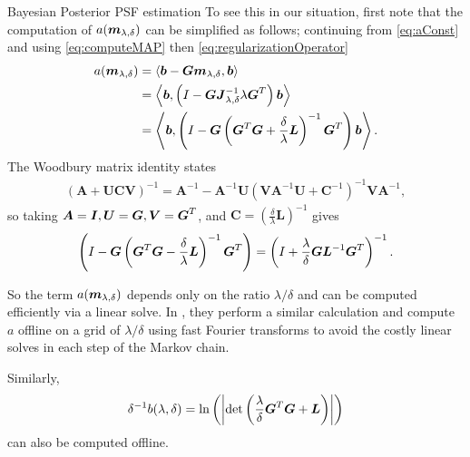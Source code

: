 \begin{chapter}{Bayesian Posterior PSF estimation}
To see this in our situation, first note that the computation of $a(\mbox{\boldmath$m$}_{\lambda,\delta})$ can be simplified as follows; continuing from \eqref{eq:aConst} and using \eqref{eq:computeMAP} then \eqref{eq:regularizationOperator}
\begin{align}
  a(\mbox{\boldmath$m$}_{\lambda,\delta}) 
    &= \left\langle\mbox{\boldmath$b$} - \mbox{\boldmath$G$}\mbox{\boldmath$m$}_{\lambda,\delta},\mbox{\boldmath$b$}\right\rangle\nonumber\\
    &=  \left\langle\mbox{\boldmath$b$},\left(I - \mbox{\boldmath$G$}  \mbox{\boldmath$J$}_{\lambda,\delta}^{-1}\lambda\mbox{\boldmath$G$}^T\right) \mbox{\boldmath$b$}\right\rangle\nonumber\\
    &= \left\langle \mbox{\boldmath$b$},\left( I - \mbox{\boldmath$G$}  \left( \mbox{\boldmath$G$}^T\mbox{\boldmath$G$} + \frac{\delta}{\lambda}\mbox{\boldmath$L$} \right)^{-1}\mbox{\boldmath$G$}^T \right)\mbox{\boldmath$b$} \right\rangle. 
\end{align}
The Woodbury matrix identity \citep{woodbury1950inverting} states
\begin{align}
  (\bm A + \bm U\bm C\bm V)^{-1} = \bm A^{-1} - \bm A^{-1}\bm U\left(\bm V\bm A^{-1}\bm U + \bm C^{-1}\right)^{-1}\bm V\bm A^{-1},
\end{align}
so taking $\mbox{\boldmath$A$} = \mbox{\boldmath$I$},\mbox{\boldmath$U$}=\mbox{\boldmath$G$}, \mbox{\boldmath$V$}=\mbox{\boldmath$G$}^T$, and $\bm C= \left(\frac\delta \lambda\bm L\right)^{-1}$ gives
\begin{equation}
  \left(I - \mbox{\boldmath$G$}  \left(\mbox{\boldmath$G$}^T\mbox{\boldmath$G$} - \frac{\delta}{\lambda}\mbox{\boldmath$L$}\right)^{-1}\mbox{\boldmath$G$}^T\right)
  = \left(I + \frac \lambda\delta \mbox{\boldmath$G$}\mbox{\boldmath$L$}^{-1}\mbox{\boldmath$G$}^T\right)^{-1}.
\end{equation}

So the term $a(\mbox{\boldmath$m$}_{\lambda,\delta})$ depends only on the ratio $\lambda/\delta$ and can be computed efficiently via a linear solve.
In \citep{fox2015fast}, they perform a similar calculation and compute $a$ offline on a grid of $\lambda/\delta$ using fast Fourier transforms to avoid the costly linear solves in each step of the Markov chain.

Similarly, 
\begin{equation}
  \delta^{-1}b(\lambda,\delta) = \ln\left(\left|\det\left(\frac \lambda\delta \mbox{\boldmath$G$}^T\mbox{\boldmath$G$} + \mbox{\boldmath$L$}\right)\right|\right)
\end{equation}
can also be computed offline.  

\end{chapter}
